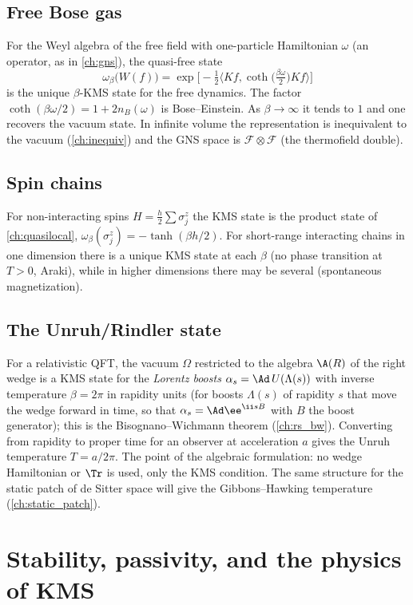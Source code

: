 \subsection{Free Bose gas}
For the Weyl algebra of the free field with one-particle Hamiltonian $\omega$ (an operator, as in \cref{ch:gns}), the quasi-free state
\begin{equation}
\omega_\beta\big(W(f)\big)=\exp\Big[-\tfrac12\big\langle Kf,\coth\!\big(\tfrac{\beta\omega}{2}\big)Kf\big\rangle\Big]
\end{equation}
is the unique $\beta$-KMS state for the free dynamics. The factor $\coth(\beta\omega/2)=1+2n_B(\omega)$ is Bose--Einstein. As $\beta\to\infty$ it tends to $1$ and one recovers the vacuum state. In infinite volume the representation is inequivalent to the vacuum (\cref{ch:inequiv}) and the GNS space is $\mathcal F\otimes\mathcal F$ (the thermofield double).

\subsection{Spin chains}
For non-interacting spins $H=\frac h2\sum\sigma^z_j$ the KMS state is the product state of \cref{ch:quasilocal}, $\omega_\beta(\sigma^z_j)=-\tanh(\beta h/2)$. For short-range interacting chains in one dimension there is a unique KMS state at each $\beta$ (no phase transition at $T>0$, Araki), while in higher dimensions there may be several (spontaneous magnetization).

\subsection{The Unruh/Rindler state}
For a relativistic QFT, the vacuum $\Omega$ restricted to the algebra $\A(R)$ of the right wedge is a KMS state for the \emph{Lorentz boosts} $\alpha_s=\Ad\,U(\Lambda(s))$ with inverse temperature $\beta=2\pi$ in rapidity units (for boosts $\Lambda(s)$ of rapidity $s$ that move the wedge forward in time, so that $\alpha_s=\Ad\ee^{\ii sB}$ with $B$ the boost generator); this is the Bisognano--Wichmann theorem (\cref{ch:rs_bw}). Converting from rapidity to proper time for an observer at acceleration $a$ gives the Unruh temperature $T=a/2\pi$. The point of the algebraic formulation: no wedge Hamiltonian or $\Tr$ is used, only the KMS condition. The same structure for the static patch of de Sitter space will give the Gibbons--Hawking temperature (\cref{ch:static_patch}).

\section{Stability, passivity, and the physics of KMS}

